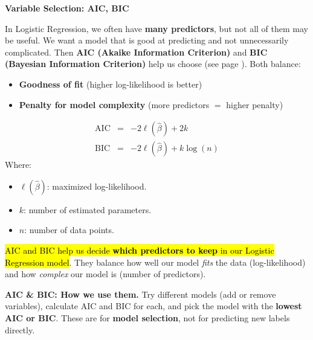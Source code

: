 \highspace
\begin{flushleft}
    \textcolor{Green3}{ \textbf{Variable Selection: AIC, BIC}}
\end{flushleft}
In Logistic Regression, we often have \textbf{many predictors}, but not all of them may be useful. We want a model that is good at predicting and not unnecessarily complicated. Then \textbf{AIC (Akaike Information Criterion)} and \textbf{BIC (Bayesian Information Criterion)} help us choose (see page \pageref{paragraph: AIC and BIC}). Both balance:
\begin{itemize}
    \item \textbf{Goodness of fit} (higher log-likelihood is better)
    \item \textbf{Penalty for model complexity} (more predictors $=$ higher penalty)
\end{itemize}
\begin{equation*}
    \begin{array}{rcl}
        \text{AIC} &=& -2 \ell\left(\hat{\beta}\right) + 2k \\ [.6em]
        \text{BIC} &=& -2 \ell\left(\hat{\beta}\right) + k \log(n)
    \end{array}
\end{equation*}
Where:
\begin{itemize}
    \item $\ell(\hat{\beta})$: maximized log-likelihood.
    \item $k$: number of estimated parameters.
    \item $n$: number of data points.
\end{itemize}
\hl{AIC and BIC help us decide \textbf{which predictors to keep} in our Logistic Regression model}. They balance how well our model \emph{fits} the data (log-likelihood) and how \emph{complex} our model is (number of predictors).

\highspace
\textcolor{Green3}{ \textbf{AIC \& BIC: How we use them.}} Try different models (add or remove variables), calculate AIC and BIC for each, and pick the model with the \textbf{lowest AIC or BIC}. These are for \textbf{model selection}, not for predicting new labels directly.

\newpage

